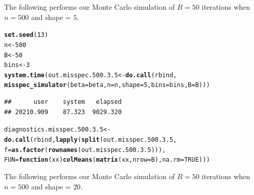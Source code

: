 \documentclass[11pt]{article}\usepackage[]{graphicx}\usepackage[]{color}
\makeatletter
\newcommand{\hlnum}[1]{\textcolor[rgb]{0.686,0.059,0.569}{#1}}%
\newcommand{\hlstd}[1]{\textcolor[rgb]{0.345,0.345,0.345}{#1}}%
\newcommand{\hlkwa}[1]{\textcolor[rgb]{0.161,0.373,0.58}{\textbf{#1}}}%
\newcommand{\hlkwb}[1]{\textcolor[rgb]{0.69,0.353,0.396}{#1}}%
\newcommand{\hlkwc}[1]{\textcolor[rgb]{0.333,0.667,0.333}{#1}}%
\newcommand{\hlkwd}[1]{\textcolor[rgb]{0.737,0.353,0.396}{\textbf{#1}}}%
\newenvironment{kframe}{%
 \def\at@end@of@kframe{}%
 \ifinner\ifhmode%
  \def\at@end@of@kframe{\end{minipage}}%
  \begin{minipage}{\columnwidth}%
 \fi\fi%
 \def\FrameCommand##1{\hskip\@totalleftmargin \hskip-\fboxsep
 \colorbox{shadecolor}{##1}\hskip-\fboxsep
     \hskip-\linewidth \hskip-\@totalleftmargin \hskip\columnwidth}%
 \MakeFramed {\advance\hsize-\width
   \@totalleftmargin\z@ \linewidth\hsize
   \@setminipage}}%
 {\par\unskip\endMakeFramed%
 \at@end@of@kframe}
\newenvironment{knitrout}{}{} %
\makeatother
\begin{document}





The following performs our Monte Carlo simulation of $B = 50$ iterations 
when $n = 500$ and shape = $5$. 

\begin{knitrout}
\color{fgcolor}\begin{kframe}
\begin{alltt}
\hlkwd{set.seed}\hlstd{(}\hlnum{13}\hlstd{)}
\hlstd{n} \hlkwb{<-} \hlnum{500}
\hlstd{B} \hlkwb{<-} \hlnum{50}
\hlstd{bins} \hlkwb{<-} \hlnum{3}
\hlkwd{system.time}\hlstd{(out.misspec.500.3.5} \hlkwb{<-} \hlkwd{do.call}\hlstd{(rbind,}
  \hlkwd{misspec_simulator}\hlstd{(}\hlkwc{beta} \hlstd{= beta,} \hlkwc{n} \hlstd{= n,} \hlkwc{shape} \hlstd{=} \hlnum{5}\hlstd{,} \hlkwc{bins} \hlstd{= bins,} \hlkwc{B} \hlstd{= B)))}
\end{alltt}
\begin{verbatim}
##      user    system   elapsed 
## 20210.909    87.323  9029.320
\end{verbatim}
\begin{alltt}
\hlstd{diagnostics.misspec.500.3.5} \hlkwb{<-} \hlkwd{do.call}\hlstd{(rbind,} \hlkwd{lapply}\hlstd{(}\hlkwd{split}\hlstd{(out.misspec.500.3.5,}
  \hlkwc{f} \hlstd{=} \hlkwd{as.factor}\hlstd{(}\hlkwd{rownames}\hlstd{(out.misspec.500.3.5))),}
  \hlkwc{FUN} \hlstd{=} \hlkwa{function}\hlstd{(}\hlkwc{xx}\hlstd{)} \hlkwd{colMeans}\hlstd{(}\hlkwd{matrix}\hlstd{(xx,} \hlkwc{nrow} \hlstd{= B),} \hlkwc{na.rm} \hlstd{=} \hlnum{TRUE}\hlstd{)))}
\end{alltt}
\end{kframe}
\end{knitrout}


The following performs our Monte Carlo simulation of $B = 50$ iterations 
when $n = 500$ and shape = $20$.
\end{document}
